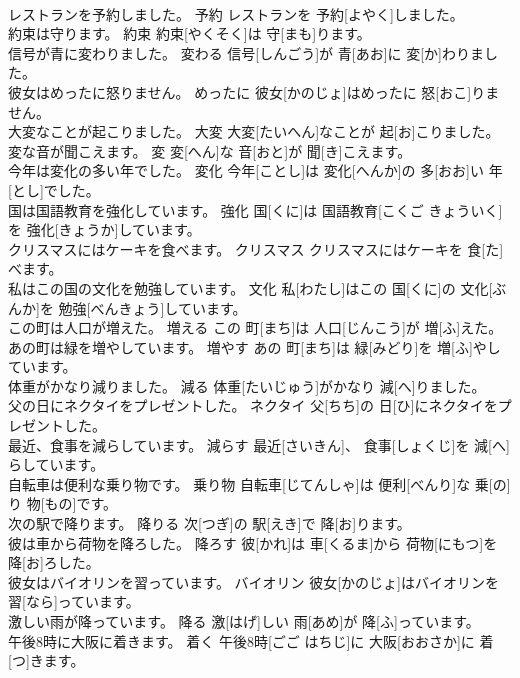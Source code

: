 \documentclass[8pt]{extreport}
\begin{document}
\begin{CJK}{UTF8}{min}
\\	レストランを予約しました。	予約	レストランを 予約[よやく]しました。	
\\	約束は守ります。	約束	約束[やくそく]は 守[まも]ります。	
\\	信号が青に変わりました。	変わる	信号[しんごう]が 青[あお]に 変[か]わりました。	
\\	彼女はめったに怒りません。	めったに	彼女[かのじょ]はめったに 怒[おこ]りません。	
\\	大変なことが起こりました。	大変	大変[たいへん]なことが 起[お]こりました。	
\\	変な音が聞こえます。	変	変[へん]な 音[おと]が 聞[き]こえます。	
\\	今年は変化の多い年でした。	変化	今年[ことし]は 変化[へんか]の 多[おお]い 年[とし]でした。	
\\	国は国語教育を強化しています。	強化	国[くに]は 国語教育[こくご きょういく]を 強化[きょうか]しています。	
\\	クリスマスにはケーキを食べます。	クリスマス	クリスマスにはケーキを 食[た]べます。	
\\	私はこの国の文化を勉強しています。	文化	私[わたし]はこの 国[くに]の 文化[ぶんか]を 勉強[べんきょう]しています。	
\\	この町は人口が増えた。	増える	この 町[まち]は 人口[じんこう]が 増[ふ]えた。	
\\	あの町は緑を増やしています。	増やす	あの 町[まち]は 緑[みどり]を 増[ふ]やしています。	
\\	体重がかなり減りました。	減る	体重[たいじゅう]がかなり 減[へ]りました。	
\\	父の日にネクタイをプレゼントした。	ネクタイ	父[ちち]の 日[ひ]にネクタイをプレゼントした。	
\\	最近、食事を減らしています。	減らす	最近[さいきん]、 食事[しょくじ]を 減[へ]らしています。	
\\	自転車は便利な乗り物です。	乗り物	自転車[じてんしゃ]は 便利[べんり]な 乗[の]り 物[もの]です。	
\\	次の駅で降ります。	降りる	次[つぎ]の 駅[えき]で 降[お]ります。	
\\	彼は車から荷物を降ろした。	降ろす	彼[かれ]は 車[くるま]から 荷物[にもつ]を 降[お]ろした。	
\\	彼女はバイオリンを習っています。	バイオリン	彼女[かのじょ]はバイオリンを 習[なら]っています。	
\\	激しい雨が降っています。	降る	激[はげ]しい 雨[あめ]が 降[ふ]っています。	
\\	午後8時に大阪に着きます。	着く	午後8時[ごご はちじ]に 大阪[おおさか]に 着[つ]きます。	

\end{CJK}
\end{document}
